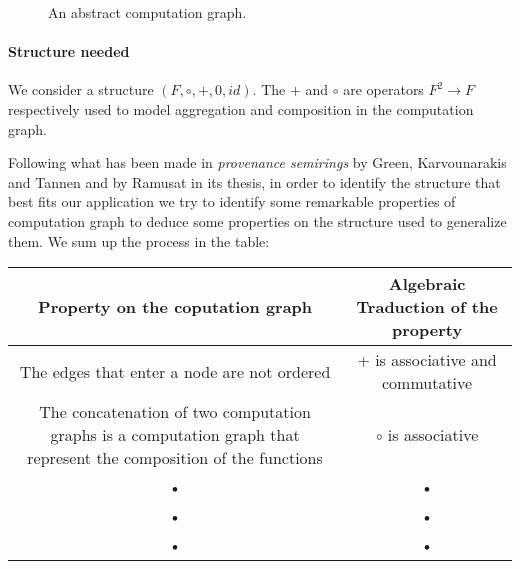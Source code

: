 \documentclass[11pt,a4paper]{article}
\begin{document}
\begin{figure}[!h]
	\centering
	\caption{An abstract computation graph.}
	\label{fig:graphe_calc_abstr}
	\end{figure}

\paragraph{Structure needed} We consider a structure $(F,\circ,+,0,id)$. The $+$ and $\circ$ are operators $F^2 \to F$ respectively used to model aggregation and composition in the computation graph.

Following what has been made in \textit{provenance semirings} by Green, Karvounarakis and Tannen and by Ramusat in its thesis, in order to identify the structure that best fits our application we try to identify some remarkable properties of computation graph to deduce some properties on the structure used to generalize them. We sum up the process in the table:

\begin{tabular}{|c|c|}
\hline 
\textbf{Property on the coputation graph} & \textbf{Algebraic Traduction of the property} \\ 
\hline 
The edges that enter a node are not ordered & + is associative and commutative \\ 
The concatenation of two computation graphs is a computation graph that represent the composition of the functions & $\circ$ is associative \\ 
\hline 
• & • \\ 
\hline 
• & • \\ 
\hline 
• & • \\ 
\hline 
\end{tabular} 
\end{document}
